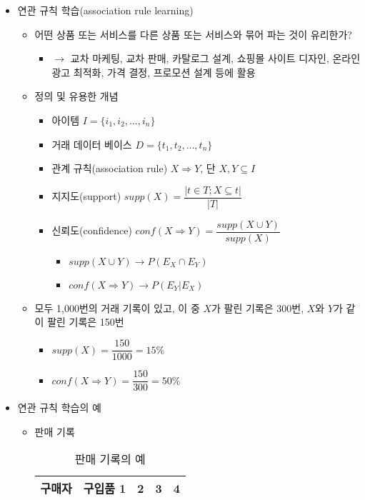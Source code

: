 \begin{itemize}
\item 연관 규칙 학습(association rule learning)
	\begin{itemize}
	\item 어떤 상품 또는 서비스를 다른 상품 또는 서비스와 묶어 파는 것이 유리한가? 
		\begin{itemize}
		\item $\rightarrow$ 교차 마케팅, 교차 판매, 카탈로그  설계, 쇼핑몰 사이트 디자인, 온라인 광고 최적화, 가격 결정, 프로모션 설계 등에 활용
		\end{itemize}
	\item 정의 및 유용한 개념
		\begin{itemize}
		\item 아이템 $I=\{i_{1}, i_{2}, \ldots, i_{n} \}$		
		\item 거래 데이터 베이스 $D = \{t_{1}, t_{2}, \ldots, t_{n} \}$
		\item 관계 규칙(association rule) $X \Rightarrow Y$, 단 $X,Y \subseteq I$
		\item 지지도(support) $supp(X) = \dfrac{|t \in T; X \subseteq t|}{|T|}$
		\item 신뢰도(confidence) $ conf(X \Rightarrow Y) = \dfrac{supp(X \cup Y)}{supp(X)} $
			\begin{itemize}
			\item $supp(X \cup Y) \rightarrow P(E_{X} \cap E_{Y})$
			\item $conf(X \Rightarrow Y) \rightarrow P(E_{Y}|E_{X}) $
			\end{itemize}
		\end{itemize}	
	\item 모두 1,000번의 거래 기록이 있고, 이 중 $X$가 팔린 기록은 300번, $X$와 $Y$가 같이 팔린 기록은 150번
		\begin{itemize}
		\item $supp(X) = \dfrac{150}{1000} = 15\%$
		\item $conf(X \Rightarrow Y) = \dfrac{150}{300} = 50\%$ 
		\end{itemize}		
	\end{itemize}	
\item 연관 규칙 학습의 예
	\begin{itemize}
	\item 판매 기록
		\begin{table}[htp]
		\caption{판매 기록의 예}
		\begin{center}
		\begin{tabular}{lllll}
		\toprule
		구매자	 & 구입품 1 & 2  & 3  & 4 \\
			\midrule

\end{tabular}
\end{center}
\end{table}
\end{itemize}
\end{itemize}
